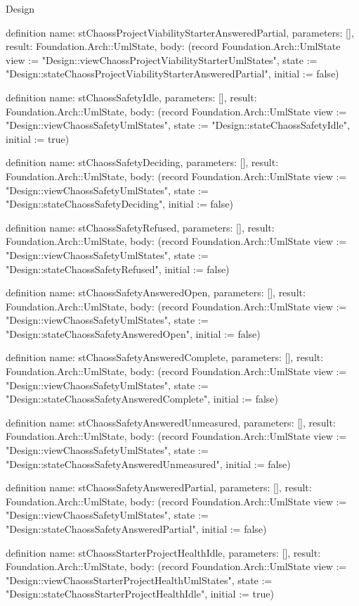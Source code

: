 \begin{lexlean}{Design}
\begin{semanticmodule}
definition{
  name: stChaossProjectViabilityStarterAnsweredPartial,
  parameters: [],
  result: Foundation.Arch::UmlState,
  body: (record Foundation.Arch::UmlState {view := "Design::viewChaossProjectViabilityStarterUmlStates", state := "Design::stateChaossProjectViabilityStarterAnsweredPartial", initial := false})
}

definition{
  name: stChaossSafetyIdle,
  parameters: [],
  result: Foundation.Arch::UmlState,
  body: (record Foundation.Arch::UmlState {view := "Design::viewChaossSafetyUmlStates", state := "Design::stateChaossSafetyIdle", initial := true})
}

definition{
  name: stChaossSafetyDeciding,
  parameters: [],
  result: Foundation.Arch::UmlState,
  body: (record Foundation.Arch::UmlState {view := "Design::viewChaossSafetyUmlStates", state := "Design::stateChaossSafetyDeciding", initial := false})
}

definition{
  name: stChaossSafetyRefused,
  parameters: [],
  result: Foundation.Arch::UmlState,
  body: (record Foundation.Arch::UmlState {view := "Design::viewChaossSafetyUmlStates", state := "Design::stateChaossSafetyRefused", initial := false})
}

definition{
  name: stChaossSafetyAnsweredOpen,
  parameters: [],
  result: Foundation.Arch::UmlState,
  body: (record Foundation.Arch::UmlState {view := "Design::viewChaossSafetyUmlStates", state := "Design::stateChaossSafetyAnsweredOpen", initial := false})
}

definition{
  name: stChaossSafetyAnsweredComplete,
  parameters: [],
  result: Foundation.Arch::UmlState,
  body: (record Foundation.Arch::UmlState {view := "Design::viewChaossSafetyUmlStates", state := "Design::stateChaossSafetyAnsweredComplete", initial := false})
}

definition{
  name: stChaossSafetyAnsweredUnmeasured,
  parameters: [],
  result: Foundation.Arch::UmlState,
  body: (record Foundation.Arch::UmlState {view := "Design::viewChaossSafetyUmlStates", state := "Design::stateChaossSafetyAnsweredUnmeasured", initial := false})
}

definition{
  name: stChaossSafetyAnsweredPartial,
  parameters: [],
  result: Foundation.Arch::UmlState,
  body: (record Foundation.Arch::UmlState {view := "Design::viewChaossSafetyUmlStates", state := "Design::stateChaossSafetyAnsweredPartial", initial := false})
}

definition{
  name: stChaossStarterProjectHealthIdle,
  parameters: [],
  result: Foundation.Arch::UmlState,
  body: (record Foundation.Arch::UmlState {view := "Design::viewChaossStarterProjectHealthUmlStates", state := "Design::stateChaossStarterProjectHealthIdle", initial := true})
}


\end{semanticmodule}
\end{lexlean}
